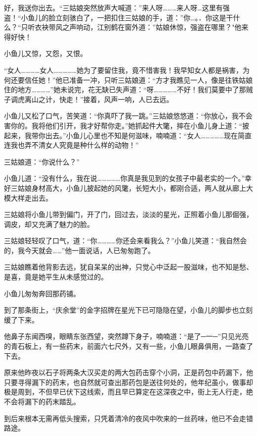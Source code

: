 \documentclass[12pt,oneside]{book}
\begin{document}
好，我送你出去。``三姑娘突然放声大喊道：''来人呀\ldots\ldots\ldots 来人呀\ldots 这里有强盗！``小鱼儿的脸立刻骇白了，一把扣住三姑娘的手，道：''你\ldots。．你这是干什么？``只听衣袂带风之声响动，江别鹤在窗外道：''姑娘休惊，强盗在哪里？"他来得好快！

小鱼儿又惊，又怨，又恨。

``女人\ldots\ldots\ldots\ldots 女人\ldots\ldots\ldots\ldots\ldots 她为了要留住我，竟不惜害我！我早知女人都是祸害，为何还要信任她！''他已准备一冲，只听三姑娘道：``方才我瞧见一人，像是往铁姑娘住的地方\ldots\ldots\ldots\ldots{}''她未说完，花无缺已失声道：``呀\ldots\ldots\ldots\ldots\ldots 不好！我们莫要中了那贼子调虎离山之计，快走！''接着，风声一响，人已去远。

小鱼儿又松了口气，苦笑道：``你真吓了我一跳。''三姑娘悠悠道：``你放心，我不会害你的。我将他们引开，我才好帮你走。''她抓起件大氅，摔在小鱼儿身上道：``披起来，我带你出去。''小鱼儿心里也不知是何滋味，喃喃道：``女人\ldots\ldots\ldots\ldots\ldots 现在简直连我也弄不清女人究竟是种什么样的动物！''

三姑娘道：``你说什么？''

小鱼儿道：``没有什么，我在说\ldots\ldots\ldots\ldots\ldots 你真是我见到的女孩子中最老实的一个。''幸好三姑娘身材高大，小鱼儿披起她的风氅，长短大小，都刚合适，两人就从廊上大模大样走出去。

三姑娘将小鱼儿带到偏门，开了门，回过去，淡淡的星光，正照着小鱼儿那倔强，调皮，却又充满了魅力的脸。

三姑娘轻轻叹了口气，道：``你\ldots\ldots\ldots\ldots 你还会来看我么？''小鱼儿笑道：``我自然会的，我今天就会\ldots\ldots{}''他一面说话，人已匆匆跑了。

三姑娘瞧着他背影去远，犹自呆呆的出神，只觉心中泛起一股滋味，也不知是愁、是喜，竟是她平生从未感觉过的。

小鱼儿匆匆奔回那药铺。

到了那条街上，``庆余堂''的金字招牌在星光下已可隐隐在望，小鱼儿的脚步也立刻缓了下来。

他鼻子东闻西嗅，眼睛东张西望，突然蹲下身子，喃喃道：``是了─一─''只见光亮的青石板上，有一些药末，前面六七尺外，又有一些，小鱼儿眼鼻俱用，一路查了下去。

原来他昨夜以石子将两条大汉买走的两大包药击穿个小洞，正是药包中药漏下，他只要寻得漏下的药末，也自然就可查出那药包是送往何处的，他年纪虽小，做事却极是周到，不但早已伏下这线索，而且早已算定在这深夜之中，街上无人行走，绝不会将漏下的药末踏乱。

到后来根本无需再低头搜索，只凭着清冷的夜风中吹来的一丝药味，他已不会走错路途。
\end{document}
